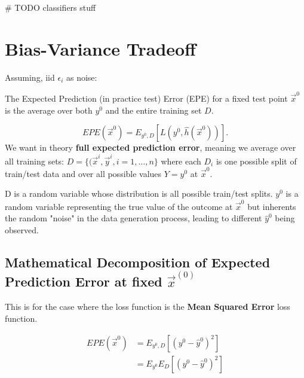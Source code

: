 \documentclass[a4paper]{article}
\begin{document}
# TODO classifiers stuff

  \section{Bias-Variance Tradeoff}
  
  Assuming, iid $\epsilon_i$ as noise:
  \begin{definition}
    The Expected Prediction (in practice test) Error (EPE) for a fixed test point $\vec{x}^0$ is the average over both 
      $y^0$ and the entire training set $D$. 

      \[
        EPE(\vec{x}^0) = E_{y^0, D} [L(y^0, \hat{h}(\vec{x}^0))]
      .\] 
      We want in theory \textbf{full expected prediction error}, meaning we average over all training sets:
      $D = \{(\vec{x}^i, \vec{y}^i, i = 1,\ldots,n \}$ where each $D_i$ is one possible split of train/test data and
      over all possible values $Y=y^0$ at $\vec{x}^0$.
  \end{definition}

  \begin{remark}
    D is a random variable whose distribution is all possible train/test splits. 
    $y^0$ is a random variable representing the true value of the outcome at $\vec{x}^0$ but inherents the random "noise" 
    in the data generation process, leading to different $\hat{y}^0$ being observed.
  \end{remark}

  \subsection{Mathematical Decomposition of Expected Prediction Error at fixed $\vec{x}^{(0)}$}
  \begin{note}
    This is for the case where the loss function is the \textbf{Mean Squared Error} loss function.
  \end{note}
  \begin{align*}
    EPE(\vec{x}^0) &= E_{y^0, D} [(y^0 - \hat{y}^0)^2] \\
                   &= E_{y^0} E_D [(y^0 - \hat{y}^0)^2] 
  \end{align*}
  
\end{document}
